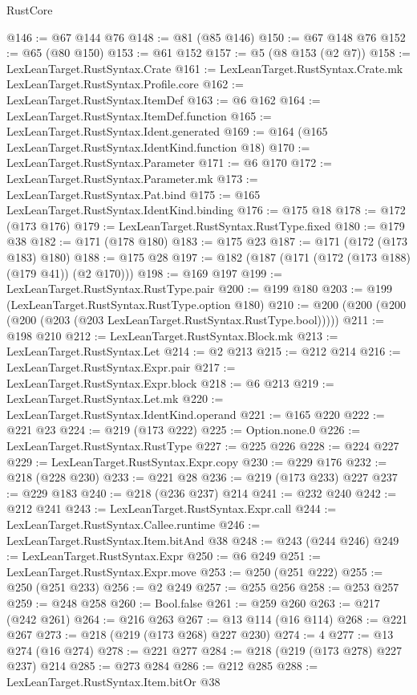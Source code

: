 \begin{lexlean}{RustCore}
\begin{coremodule}
{\begin{coremodule}
{{{{{@146 := @67 @144 @76
@148 := @81 (@85 @146)
@150 := @67 @148 @76
@152 := @65 (@80 @150)
@153 := @61 @152
@157 := @5 (@8 @153 (@2 @7))
@158 := LexLeanTarget.RustSyntax.Crate
@161 := LexLeanTarget.RustSyntax.Crate.mk LexLeanTarget.RustSyntax.Profile.core
@162 := LexLeanTarget.RustSyntax.ItemDef
@163 := @6 @162
@164 := LexLeanTarget.RustSyntax.ItemDef.function
@165 := LexLeanTarget.RustSyntax.Ident.generated
@169 := @164 (@165 LexLeanTarget.RustSyntax.IdentKind.function @18)
@170 := LexLeanTarget.RustSyntax.Parameter
@171 := @6 @170
@172 := LexLeanTarget.RustSyntax.Parameter.mk
@173 := LexLeanTarget.RustSyntax.Pat.bind
@175 := @165 LexLeanTarget.RustSyntax.IdentKind.binding
@176 := @175 @18
@178 := @172 (@173 @176)
@179 := LexLeanTarget.RustSyntax.RustType.fixed
@180 := @179 @38
@182 := @171 (@178 @180)
@183 := @175 @23
@187 := @171 (@172 (@173 @183) @180)
@188 := @175 @28
@197 := @182 (@187 (@171 (@172 (@173 @188) (@179 @41)) (@2 @170)))
@198 := @169 @197
@199 := LexLeanTarget.RustSyntax.RustType.pair
@200 := @199 @180
@203 := @199 (LexLeanTarget.RustSyntax.RustType.option @180)
@210 := @200 (@200 (@200 (@200 (@203 (@203 LexLeanTarget.RustSyntax.RustType.bool)))))
@211 := @198 @210
@212 := LexLeanTarget.RustSyntax.Block.mk
@213 := LexLeanTarget.RustSyntax.Let
@214 := @2 @213
@215 := @212 @214
@216 := LexLeanTarget.RustSyntax.Expr.pair
@217 := LexLeanTarget.RustSyntax.Expr.block
@218 := @6 @213
@219 := LexLeanTarget.RustSyntax.Let.mk
@220 := LexLeanTarget.RustSyntax.IdentKind.operand
@221 := @165 @220
@222 := @221 @23
@224 := @219 (@173 @222)
@225 := Option.none.{0}
@226 := LexLeanTarget.RustSyntax.RustType
@227 := @225 @226
@228 := @224 @227
@229 := LexLeanTarget.RustSyntax.Expr.copy
@230 := @229 @176
@232 := @218 (@228 @230)
@233 := @221 @28
@236 := @219 (@173 @233) @227
@237 := @229 @183
@240 := @218 (@236 @237) @214
@241 := @232 @240
@242 := @212 @241
@243 := LexLeanTarget.RustSyntax.Expr.call
@244 := LexLeanTarget.RustSyntax.Callee.runtime
@246 := LexLeanTarget.RustSyntax.Item.bitAnd @38
@248 := @243 (@244 @246)
@249 := LexLeanTarget.RustSyntax.Expr
@250 := @6 @249
@251 := LexLeanTarget.RustSyntax.Expr.move
@253 := @250 (@251 @222)
@255 := @250 (@251 @233)
@256 := @2 @249
@257 := @255 @256
@258 := @253 @257
@259 := @248 @258
@260 := Bool.false
@261 := @259 @260
@263 := @217 (@242 @261)
@264 := @216 @263
@267 := @13 @114 (@16 @114)
@268 := @221 @267
@273 := @218 (@219 (@173 @268) @227 @230)
@274 := 4
@277 := @13 @274 (@16 @274)
@278 := @221 @277
@284 := @218 (@219 (@173 @278) @227 @237) @214
@285 := @273 @284
@286 := @212 @285
@288 := LexLeanTarget.RustSyntax.Item.bitOr @38
}}}}}
\end{coremodule}}
\end{coremodule}
\end{lexlean}
